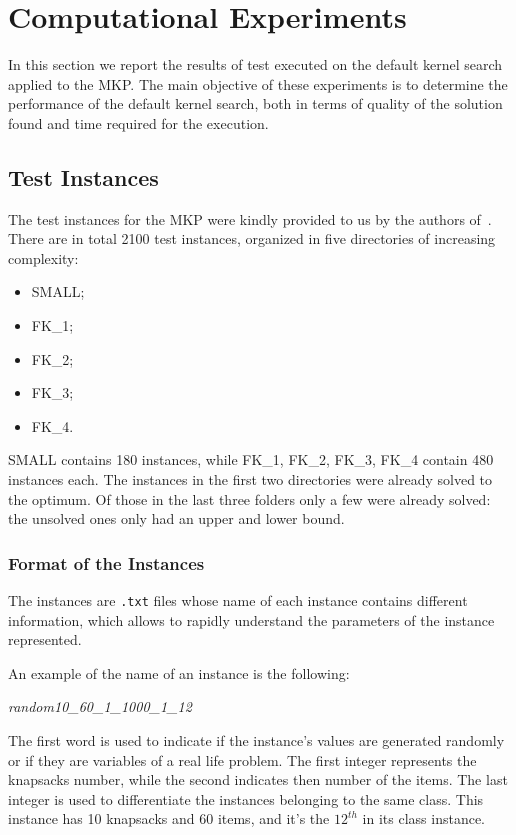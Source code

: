 \chapter{Computational Experiments}\label{ch:computational-experiments}
In this section we report the results of test executed on the default kernel search applied to the MKP\@.
The main objective of these experiments is to determine the performance of the default kernel search,
both in terms of quality of the solution found and time required for the execution.


\section{Test Instances}
The test instances for the MKP were kindly provided to us by the authors of~\cite{mkp:2019}.\\
There are in total 2100 test instances, organized in
five directories of increasing complexity:
\begin{itemize}
    \item SMALL;
    \item FK\_1;
    \item FK\_2;
    \item FK\_3;
    \item FK\_4.
\end{itemize}
SMALL contains 180 instances, while FK\_1, FK\_2, FK\_3, FK\_4 contain 480 instances each.
The instances in the first two directories were already solved to the optimum.
Of those in the last three folders only a few were already solved: the unsolved
ones only had an upper and lower bound.

\subsection{Format of the Instances}
The instances are \texttt{.txt} files whose name of each instance contains different information,
which allows to rapidly understand the parameters of the instance represented.

An example of the name of an instance is the following:
\begin{center}
    \textit{random10\_60\_1\_1000\_1\_12}
\end{center}
The first word is used to indicate if the instance's values are generated randomly or if they are variables of a real
life problem.
The first integer represents the knapsacks number, while the second indicates then number of the items.
The last integer is used to differentiate the instances belonging to the same class.
This instance has 10 knapsacks and 60 items, and it's the \(12^{th}\) in its class instance.

